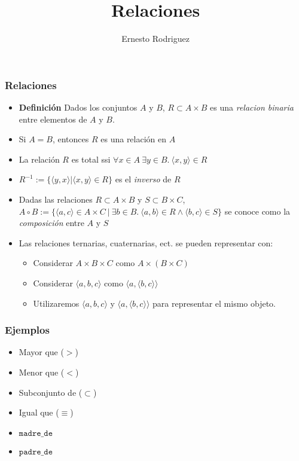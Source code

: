 \documentclass{beamer}
\title[Relaciones]{Relaciones}
\author{Ernesto Rodriguez}
\institute{
    Universidad del Itsmo \\
    \medskip \textit{erodriguez@unis.edu.gt}
}
\date[\today]{}
\begin{document}
\begin{frame}
    \maketitle
\end{frame}

\begin{frame}
\frametitle{Relaciones}
\begin{itemize}
    \item{{\bf Definici\'on} Dados los conjuntos $A$ y $B$,
    $R\subset A\times B$ es una \emph{relacion binaria} entre
    elementos de $A$ y $B$.}
    \item{Si $A=B$, entonces $R$ es una relaci\'on en $A$}
    \item{La relaci\'on $R$ es total ssi $\forall x\in A\ \exists y \in B.\ \langle x,y \rangle \in R$}
    \item{$R^{-1}:=\{\langle y,x \rangle|\langle x,y \rangle \in R\}$ es el
    \emph{inverso} de $R$}
    \item{Dadas las relaciones $R\subset A\times B$ y $S\subset B\times C$,
    $A\circ B:=\{\langle a,c \rangle \in A\times C\ |\ \exists b\in B.\ \langle a,b \rangle
    \in R \wedge \langle b,c \rangle \in S \}$ se conoce como la \emph{composici\'on}
    entre $A$ y $S$}
    \item{Las relaciones ternarias, cuaternarias, ect. se pueden representar con:
    \begin{itemize}
        \item{Considerar $A\times B\times C$ como $A\times(B\times C)$}
        \item{Considerar $\langle a,b,c \rangle$ como $\langle a,\langle b,c\rangle \rangle$}
        \item{Utilizaremos $\langle a,b,c \rangle$ y $\langle a,\langle b,c\rangle \rangle$
        para representar el mismo objeto.}
    \end{itemize}}
\end{itemize}
\end{frame}

\begin{frame}
    \frametitle{Ejemplos}
    \begin{itemize}
        \item{Mayor que ($>$)}
        \item{Menor que ($<$)}
        \item{Subconjunto de ($\subset$)}
        \item{Igual que ($\equiv$)}
        \item{$\mathtt{madre\_de}$}
        \item{$\mathtt{padre\_de}$}
    \end{itemize}
\end{frame}
\end{document}
